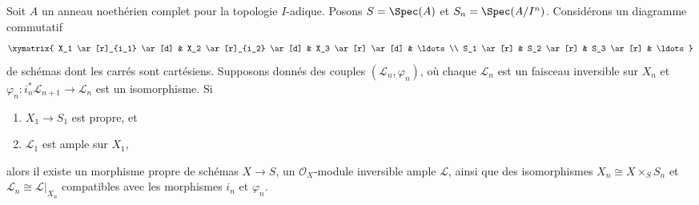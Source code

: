 \begin{theorem}
\label{theorem-algebraization}
Soit $A$ un anneau noethérien complet pour la topologie $I$-adique.
Posons $S = \Spec(A)$ et $S_n = \Spec(A/I^n)$. Considérons un diagramme
commutatif
$$
\xymatrix{
X_1 \ar[r]_{i_1} \ar[d] & X_2 \ar[r]_{i_2} \ar[d] & X_3 \ar[r] \ar[d] &
\ldots \\
S_1 \ar[r] & S_2 \ar[r] & S_3 \ar[r] & \ldots
}
$$
de schémas dont les carrés sont cartésiens. Supposons donnés des couples $(\mathcal{L}_n, \varphi_n)$,
où chaque $\mathcal{L}_n$ est un faisceau inversible sur $X_n$ et
$\varphi_n : i_n^*\mathcal{L}_{n + 1} \to \mathcal{L}_n$
est un isomorphisme. Si
\begin{enumerate}
\item $X_1 \to S_1$ est propre, et
\item $\mathcal{L}_1$ est ample sur $X_1$,
\end{enumerate}
alors il existe un morphisme propre de schémas $X \to S$,
un $\mathcal{O}_X$-module inversible ample $\mathcal{L}$,
ainsi que des isomorphismes $X_n \cong X \times_S S_n$ et
$\mathcal{L}_n \cong \mathcal{L}|_{X_n}$ compatibles avec
les morphismes $i_n$ et $\varphi_n$.
\end{theorem}

